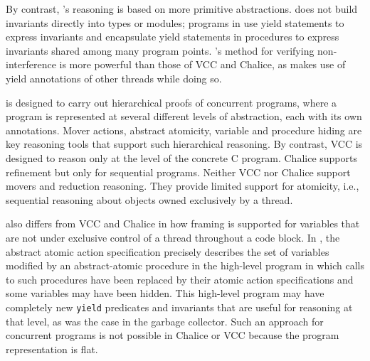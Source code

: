 By contrast, \civl's reasoning is based on more primitive abstractions.  \civl does not build invariants directly into types or modules; programs in \civl use yield statements to express invariants and encapsulate yield statements in procedures to express invariants shared among many program points. \civl's method for verifying non-interference is more powerful than those of VCC and Chalice, as \civl makes use of yield annotations of other threads while doing so. 

\civl is designed to carry out hierarchical proofs of concurrent programs, where a program is represented at several different levels of abstraction, each with its own annotations.  Mover actions, abstract atomicity, variable and procedure hiding are key reasoning tools that support such hierarchical reasoning. By contrast, VCC is designed to reason only at the level of the concrete C program. Chalice supports refinement but only for sequential programs. Neither VCC nor Chalice support movers and reduction reasoning. They provide limited support for atomicity, i.e., sequential reasoning about objects owned exclusively by a thread. 

\civl also differs from VCC and Chalice in how framing is supported for variables that are not under exclusive control of a thread throughout a code block. In \civl, the abstract atomic action specification precisely describes the set of variables modified by an abstract-atomic procedure in the high-level program in which calls to such procedures have been replaced by their atomic action specifications and some variables may have been hidden. This high-level program may have completely new {\tt yield} predicates and invariants that are useful for reasoning at that level, as was the case in the garbage collector. Such an approach for concurrent programs is not possible in Chalice or VCC because the program representation is flat.  


